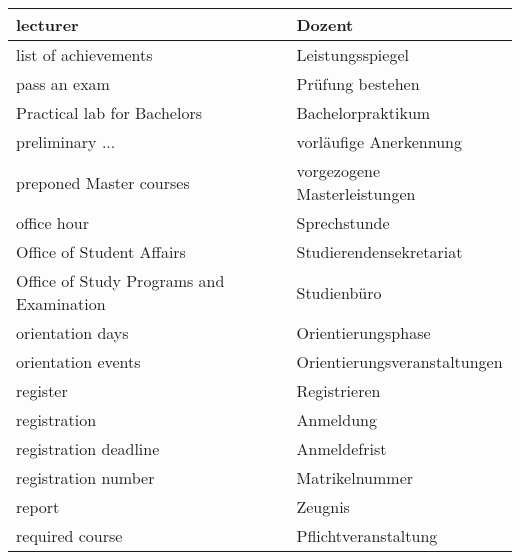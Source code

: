 \begin{longtable} {|p{.5\linewidth}|p{.5\linewidth}|}
    \hline
    lecturer                                                       & Dozent                              \\
    \hline
    list of achievements                                           & Leistungsspiegel                    \\
    \hline
    pass an exam                                                   & Prüfung bestehen                    \\
    \hline
    Practical lab for Bachelors                                    & Bachelorpraktikum                   \\
    \hline
    preliminary ...                                                & vorläufige Anerkennung              \\
    \hline
    preponed Master courses                                        & vorgezogene Masterleistungen        \\
    \hline
    office hour                                                    & Sprechstunde                        \\
    \hline
    Office of Student Affairs                                      & Studierendensekretariat             \\
    \hline
    Office of Study Programs and Examination                       & Studienbüro                         \\
    \hline
    orientation days                                               & Orientierungsphase                  \\
    \hline
    orientation events                                             & Orientierungsveranstaltungen        \\
    \hline
    register                                                       & Registrieren                        \\
    \hline
    registration                                                   & Anmeldung                           \\
    \hline
    registration deadline                                          & Anmeldefrist                        \\
    \hline
    registration number                                            & Matrikelnummer                      \\
    \hline
    report                                                         & Zeugnis                             \\
    \hline
    required course                                                & Pflichtveranstaltung                \\

\end{longtable}
